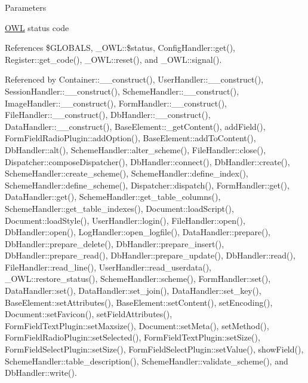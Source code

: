 \begin{DoxyParams}{Parameters}
\item[\mbox{\tt[in]} {\em \$status}]\hyperlink{classOWL}{OWL} status code \item[\mbox{\tt[in]} {\em \$params}]\end{DoxyParams}


References \$GLOBALS, \_\-OWL::\$status, ConfigHandler::get(), Register::get\_\-code(), \_\-OWL::reset(), and \_\-OWL::signal().



Referenced by Container::\_\-\_\-construct(), UserHandler::\_\-\_\-construct(), SessionHandler::\_\-\_\-construct(), SchemeHandler::\_\-\_\-construct(), ImageHandler::\_\-\_\-construct(), FormHandler::\_\-\_\-construct(), FileHandler::\_\-\_\-construct(), DbHandler::\_\-\_\-construct(), DataHandler::\_\-\_\-construct(), BaseElement::\_\-getContent(), addField(), FormFieldRadioPlugin::addOption(), BaseElement::addToContent(), DbHandler::alt(), SchemeHandler::alter\_\-scheme(), FileHandler::close(), Dispatcher::composeDispatcher(), DbHandler::connect(), DbHandler::create(), SchemeHandler::create\_\-scheme(), SchemeHandler::define\_\-index(), SchemeHandler::define\_\-scheme(), Dispatcher::dispatch(), FormHandler::get(), DataHandler::get(), SchemeHandler::get\_\-table\_\-columns(), SchemeHandler::get\_\-table\_\-indexes(), Document::loadScript(), Document::loadStyle(), UserHandler::login(), FileHandler::open(), DbHandler::open(), LogHandler::open\_\-logfile(), DataHandler::prepare(), DbHandler::prepare\_\-delete(), DbHandler::prepare\_\-insert(), DbHandler::prepare\_\-read(), DbHandler::prepare\_\-update(), DbHandler::read(), FileHandler::read\_\-line(), UserHandler::read\_\-userdata(), \_\-OWL::restore\_\-status(), SchemeHandler::scheme(), FormHandler::set(), DataHandler::set(), DataHandler::set\_\-join(), DataHandler::set\_\-key(), BaseElement::setAttributes(), BaseElement::setContent(), setEncoding(), Document::setFavicon(), setFieldAttributes(), FormFieldTextPlugin::setMaxsize(), Document::setMeta(), setMethod(), FormFieldRadioPlugin::setSelected(), FormFieldTextPlugin::setSize(), FormFieldSelectPlugin::setSize(), FormFieldSelectPlugin::setValue(), showField(), SchemeHandler::table\_\-description(), SchemeHandler::validate\_\-scheme(), and DbHandler::write().

